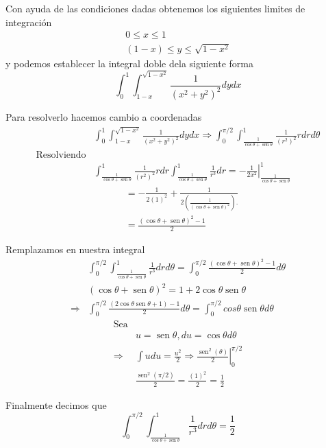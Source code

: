 Con ayuda de las condiciones dadas obtenemos los siguientes limites de integración
$$
\begin{gathered}
0 \leq x \leq 1 \\
(1-x) \leq y \leq \sqrt{1-x^2}
\end{gathered}
$$
y podemos establecer la integral doble dela siguiente forma
$$
\int_0^1 \int_{1-x}^{\sqrt{1-x^2}} \frac{1}{\left(x^2+y^2\right)^2} d y d x
$$

Para resolverlo hacemos cambio a coordenadas
$$
\begin{aligned}
& \int_0^1 \int_{1-x}^{\sqrt{1-x^2}} \frac{1}{\left(x^2+y^2\right)^2} d y d x\Rightarrow \int_0^{\pi / 2} \int_{\frac{1}{\cos \theta+\operatorname{sen} \theta}}^1{\frac{1}{\left(r^2\right)^2} r d r d \theta} \\
\text{Resolviendo}\\
& \int_{\frac{1}{\cos \theta+\operatorname{sen} \theta}}^1{\frac{1}
{\left(r^2\right)^2} r d r} \int_{\frac{1}{\cos \theta+\operatorname{sen} \theta}}^1 \frac{1}{r^3} d r=-\left.\frac{1}{2 x^2}\right|_{\frac{1}{\cos \theta+\operatorname{sen} \theta}}^1
\end{aligned}
$$
$$
\begin{aligned}
& =-\frac{1}{2(1)^2}+\frac{1}{2\left(\frac{1}{(\cos \theta+\operatorname{sen} \theta)^2}\right).} \\
& =\frac{(\cos \theta+\operatorname{sen} \theta)^2-1}{2}
\end{aligned}
$$

Remplazamos en nuestra integral
$$
\begin{aligned}
& \int_0^{\pi / 2} \int_{\frac{1}{\cos \theta+\operatorname{sen} \theta}}^1 \frac{1}{r^3} d r d \theta=\int_0^{\pi / 2} \frac{(\cos\theta+\operatorname{sen} \theta)^2-1}{2} d \theta \\
& (\cos \theta+\operatorname{sen} \theta)^2=1+2 \cos \theta \operatorname{sen} \theta \\
\Rightarrow & \int_0^{\pi / 2} \frac{(2\operatorname{cos}\theta \operatorname{sen} \theta+1)-1}{2} d \theta=\int_0^{\pi / 2} cos \theta \operatorname{sen} \theta d \theta
\end{aligned}
$$
$$
\begin{aligned}
\text{Sea}\\
&u=\operatorname{sen} \theta, d u=\cos \theta d \theta \\
\Rightarrow & \int u d u=\left.\frac{u^2}{2} \Rightarrow \frac{\operatorname{sen}^2(\theta)}{2}\right|_0 ^{\pi / 2} \\
& \frac{\operatorname{sen}^2(\pi / 2)}{2}=\frac{(1)^2}{2}=\frac{1}{2}
\end{aligned}
$$

Finalmente decimos que
$$
\int_0^{\pi / 2} \int_{\frac{1}{\cos \theta+\operatorname{sen} \theta}}^1 \frac{1}{r^3} d r d \theta=\frac{1}{2}
$$
